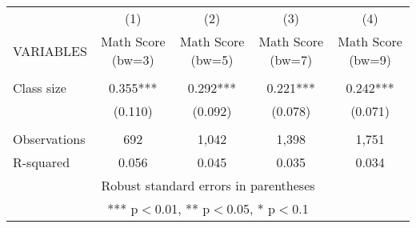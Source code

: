 \documentclass[]{article}
\begin{document}
\begin{tabular}{lcccc} \hline
 & (1) & (2) & (3) & (4) \\
VARIABLES & Math Score (bw=3) & Math Score (bw=5) & Math Score (bw=7) & Math Score (bw=9) \\ \hline
 &  &  &  &  \\
Class size & 0.355*** & 0.292*** & 0.221*** & 0.242*** \\
 & (0.110) & (0.092) & (0.078) & (0.071) \\
 &  &  &  &  \\
Observations & 692 & 1,042 & 1,398 & 1,751 \\
 R-squared & 0.056 & 0.045 & 0.035 & 0.034 \\ \hline
\multicolumn{5}{c}{ Robust standard errors in parentheses} \\
\multicolumn{5}{c}{ *** p$<$0.01, ** p$<$0.05, * p$<$0.1} \\
\end{tabular}
\end{document}
